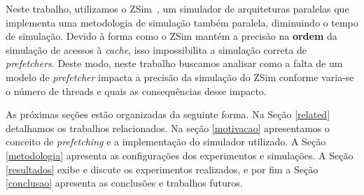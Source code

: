 \documentclass[12pt]{article}
\begin{document}

\vspace{-2mm}
Neste trabalho, utilizamos o ZSim~\mbox{\cite{sanchez2013zsim}}, um simulador de arquiteturas paralelas que implementa uma metodologia de simulação também paralela, diminuindo o tempo de simulação.
Devido à forma como o ZSim mantém a precisão na \textbf{ordem} da simulação de acessos à \textit{cache}, isso impossibilita a simulação correta de \textit{prefetchers}.
Deste modo, neste trabalho buscamos analisar como a falta de um modelo de \textit{prefetcher} impacta a precisão da simulação do ZSim conforme varia-se o número de threads e quais as consequências desse impacto.%


\vspace{-2mm}
As próximas seções estão organizadas da seguinte forma. 
Na Seção \ref{related} detalhamos os trabalhos relacionados. Na seção \ref{motivacao} apresentamos o conceito de \textit{prefetching} e a implementação do simulador utilizado. A Seção \ref{metodologia} apresenta as configurações dos experimentos e simulações. 
A Seção \ref{resultados} exibe e discute os experimentos realizados, e por fim a Seção \ref{conclusao} apresenta as conclusões e trabalhos futuros.
\end{document}
